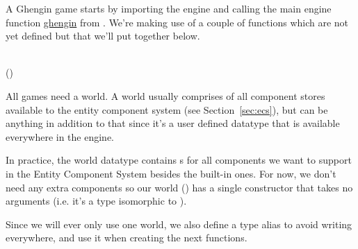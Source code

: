 A Ghengin game starts by importing the engine and calling the main engine
function \href{https://hackage.haskell.org/package/ghengin/}{ghengin} from
. We're making use of a couple of functions which are not yet defined but
that we'll put together below.

\begin{hscode}\SaveRestoreHook
{}%
%
\>[B]{}\;\<[E]%
\\[\blanklineskip]%
\>[B]{}\mathbin{::}\;(){}\<[E]%
\\
\>[B]{}\mathrel{=}\;\;\;\;\;\<[E]%
\ColumnHook
\end{hscode}\resethooks


All games need a world. A world usually comprises of all component stores
available to the entity component system (see Section~\ref{sec:ecs}), but can
be anything in addition to that since it's a user defined datatype that is
available everywhere in the engine.

In practice, the world datatype contains s for all components we want
to support in the Entity Component System besides the built-in ones. For now,
we don't need any extra components so our world () has a single
constructor that takes no arguments (i.e.  it's a type isomorphic to ).

Since we will ever only use one world, we also define a type alias to avoid
writing  everywhere, and use it when creating the next functions.

\begin{hscode}\SaveRestoreHook
{}%
%
\>[B]{}\;\mathrel{=}\<[E]%
\\[\blanklineskip]%
\>[B]{}\;\mathrel{=}\;\<[E]%
\ColumnHook
\end{hscode}\resethooks

